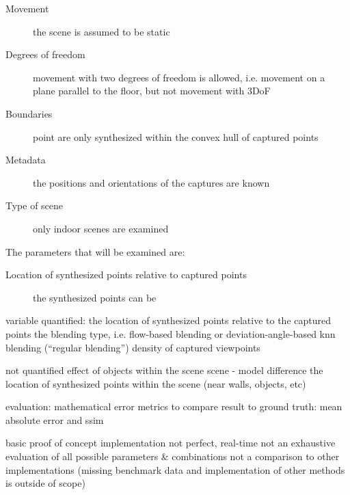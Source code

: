 \begin{description}
  \item [Movement] the scene is assumed to be static
  \item [Degrees of freedom] movement with two degrees of freedom is allowed, i.e. movement on a plane parallel to the floor, but not movement with 3DoF
  \item [Boundaries] point are only synthesized within the convex hull of captured points
  \item [Metadata] the positions and orientations of the captures are known
  \item [Type of scene] only indoor scenes are examined
\end{description}

The parameters that will be examined are:
\begin{description}
  \item[Location of synthesized points relative to captured points] the synthesized points can be 
\end{description}




variable
quantified:
  the location of synthesized points relative to the captured points
  the blending type, i.e. flow-based blending or deviation-angle-based knn blending (``regular blending'')
  density of captured viewpoints

not quantified
  effect of objects within the scene
  scene - model difference
  the location of synthesized points within the scene (near walls, objects, etc)

  evaluation:
    mathematical error metrics to compare result to ground truth: mean absolute error and ssim

basic proof of concept implementation \ar not perfect, real-time
not an exhaustive evaluation of all possible parameters \& combinations
not a comparison to other implementations (missing benchmark data and implementation of other methods is outside of scope)


